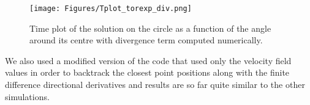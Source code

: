 \documentclass[fleqn,12pt]{siamart1116}
\begin{document}
\begin{figure}[ht]
	\centering
		\texttt{[image: Figures/Tplot\_torexp\_div.png]}
	\caption{Time plot of the solution on the circle as a function of the angle around its centre with divergence term computed numerically.}
	\label{fig:Tplot_torexp_div}
\end{figure}

We also used a modified version of the code that used only the velocity field values in order to backtrack the closest point positions along with the finite difference directional derivatives and results are so far quite similar to the other simulations.
\end{document}
